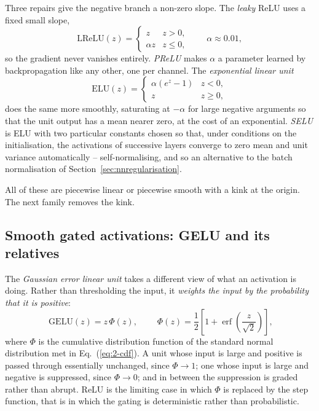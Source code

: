 Three repairs give the negative branch a non-zero slope.  The \emph{leaky}
ReLU uses a fixed small slope,
\begin{equation}
  \mathrm{LReLU}(z) = \begin{cases} z & z>0,\\ \alpha z & z\le 0,\end{cases}
  \qquad \alpha\approx0.01,
  \label{eq:8-lrelu}
\end{equation}
so the gradient never vanishes entirely.  \emph{PReLU} makes $\alpha$ a
parameter learned by backpropagation like any other, one per channel.  The
\emph{exponential linear unit}
\begin{equation}
  \mathrm{ELU}(z) = \begin{cases}
    \alpha\left(e^{z}-1\right) & z<0,\\
    z & z\ge0,
  \end{cases}
  \label{eq:8-elu}
\end{equation}
does the same more smoothly, saturating at $-\alpha$ for large negative
arguments so that the unit output has a mean nearer zero, at the cost of an
exponential.  \emph{SELU} is ELU with two particular constants chosen so that,
under conditions on the initialisation, the activations of successive layers
converge to zero mean and unit variance automatically -- self-normalising, and
so an alternative to the batch normalisation of
Section~\ref{sec:nnregularisation}.

All of these are piecewise linear or piecewise smooth with a kink at the
origin.  The next family removes the kink.

\subsection{Smooth gated activations: GELU and its relatives}
\label{sec:geluact}

The \emph{Gaussian error linear unit} takes a different view of what an
activation is doing.  Rather than thresholding the input, it \emph{weights the
input by the probability that it is positive}:
\begin{equation}
  \boxed{\;\mathrm{GELU}(z) = z\,\Phi(z),\;}
  \qquad
  \Phi(z) = \frac{1}{2}\left[1+\operatorname{erf}\!\left(\frac{z}{\sqrt{2}}\right)\right],
  \label{eq:8-gelu}
\end{equation}
where $\Phi$ is the cumulative distribution function of the standard normal
distribution met in Eq.~(\ref{eq:2-cdf}).  A unit whose input is large and
positive is passed through essentially unchanged, since $\Phi\to1$; one whose
input is large and negative is suppressed, since $\Phi\to0$; and in between the
suppression is graded rather than abrupt.  ReLU is the limiting case in which
$\Phi$ is replaced by the step function, that is in which the gating is
deterministic rather than probabilistic.

